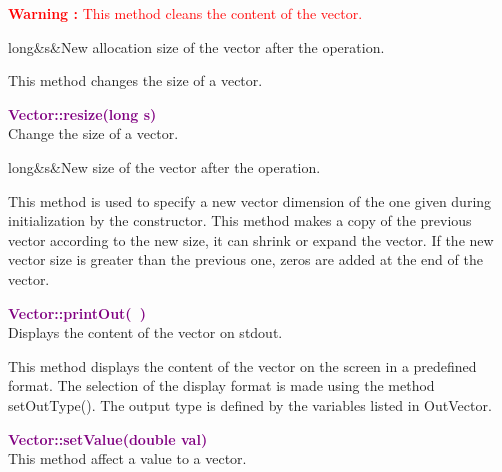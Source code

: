\hspace*{10mm}\textcolor{red}{\textbf{Warning :} This method cleans the content of the vector.}

\begin{tcolorbox}[width=\textwidth,myArgs,tabularx={ll|R}]
long&s&New allocation size of the vector after the operation.
\end{tcolorbox}

This method changes the size of a vector.

\textcolor{purple}{\textbf{Vector::resize(long s)}}\label{Vector::resize(long s)}\\
Change the size of a vector.

\begin{tcolorbox}[width=\textwidth,myArgs,tabularx={ll|R}]
long&s&New size of the vector after the operation.
\end{tcolorbox}

This method is used to specify a new vector dimension of the one given during initialization by the constructor.
This method makes a copy of the previous vector according to the new size, \ie it can shrink or expand the vector.
If the new vector size is greater than the previous one, zeros are added at the end of the vector.

\textcolor{purple}{\textbf{Vector::printOut(~)}}\label{Vector::printOut()}\\
Displays the content of the vector on stdout.

This method displays the content of the vector on the screen in a predefined format.
The selection of the display format is made using the method setOutType().
The output type is defined by the variables listed in OutVector.

\textcolor{purple}{\textbf{Vector::setValue(double val)}}\label{Vector::setValue(double val)}\\
This method affect a value to a vector.


